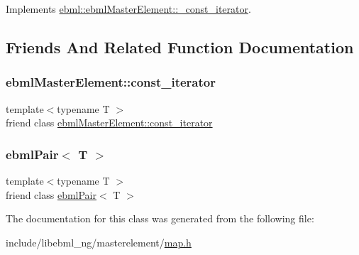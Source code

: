 Implements \mbox{\hyperlink{classebml_1_1ebmlMasterElement_1_1__const__iterator_a936395ed4c0c189a92927bfdf1e28586}{ebml\+::ebml\+Master\+Element\+::\+\_\+const\+\_\+iterator}}.



\subsection{Friends And Related Function Documentation}
\mbox{\label{classebml_1_1ebmlPair_1_1__const__iterator_a734affd0f736e2e4e03ab2cf8a9f9b26}} 
\subsubsection{\texorpdfstring{ebml\+Master\+Element\+::const\+\_\+iterator}{ebmlMasterElement::const\_iterator}}
{\footnotesize\ttfamily template$<$typename T $>$ \\
friend class \mbox{\hyperlink{classebml_1_1ebmlMasterElement_1_1const__iterator}{ebml\+Master\+Element\+::const\+\_\+iterator}}\hspace{0.3cm}{\ttfamily [friend]}}

\mbox{\label{classebml_1_1ebmlPair_1_1__const__iterator_ad1db4b5395f31070d1be2d251ee85e02}} 
\subsubsection{\texorpdfstring{ebml\+Pair$<$ T $>$}{ebmlPair< T >}}
{\footnotesize\ttfamily template$<$typename T $>$ \\
friend class \mbox{\hyperlink{classebml_1_1ebmlPair}{ebml\+Pair}}$<$ T $>$\hspace{0.3cm}{\ttfamily [friend]}}



The documentation for this class was generated from the following file\+:\begin{DoxyCompactItemize}
\item 
include/libebml\+\_\+ng/masterelement/\mbox{\hyperlink{map_8h}{map.\+h}}\end{DoxyCompactItemize}
